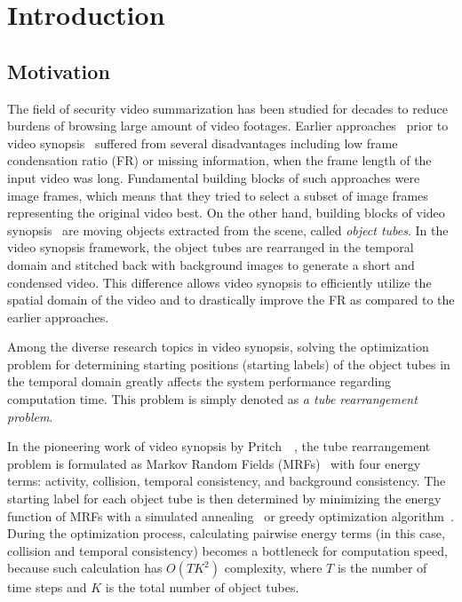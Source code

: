 \documentclass[11pt]{hyu_thesis}
\begin{document}
\chapter{Introduction}
\label{sec:intro}
\section{Motivation}
\label{sec:intro:motivation}
The field of security video summarization has been studied for decades to reduce burdens of browsing large amount of video footages. Earlier approaches~\cite{Smith1997,Petrovic2005,Hoferlin2011} prior to video synopsis~\cite{Rav-Acha2006,Pritch2007,Pritch2008} suffered from several disadvantages including low frame condensation ratio (FR) or missing information, when the frame length of the input video was long. Fundamental building blocks of such approaches were image frames, which means that they tried to select a subset of image frames representing the original video best. On the other hand, building blocks of video synopsis~\cite{Rav-Acha2006,Pritch2007,Pritch2008} are moving objects extracted from the scene, called \textit{object tubes}. In the video synopsis framework, the object tubes are rearranged in the temporal domain and stitched back with background images to generate a short and condensed video. This difference allows video synopsis to efficiently utilize the spatial domain of the video and to drastically improve the FR as compared to the earlier approaches.

Among the diverse research topics in video synopsis, solving the optimization problem for determining starting positions (starting labels) of the object tubes in the temporal domain greatly affects the system performance regarding computation time. This problem is simply denoted as \textit{a tube rearrangement problem}.

In the pioneering work of video synopsis by Pritch~\etal~\cite{Pritch2008}, the tube rearrangement problem is formulated as Markov Random Fields (MRFs)~\cite{Kolmogorov2004} with four energy terms: activity, collision, temporal consistency, and background consistency. The starting label for each object tube is then determined by minimizing the energy function of MRFs with a simulated annealing~\cite{Kirkpatrick1983} or greedy optimization algorithm~\cite{Cormen2009}. During the optimization process, calculating pairwise energy terms (in this case, collision and temporal consistency) becomes a bottleneck for computation speed, because such calculation has $O(TK^2)$ complexity, where $T$ is the number of time steps and $K$ is the total number of object tubes.
\end{document}
